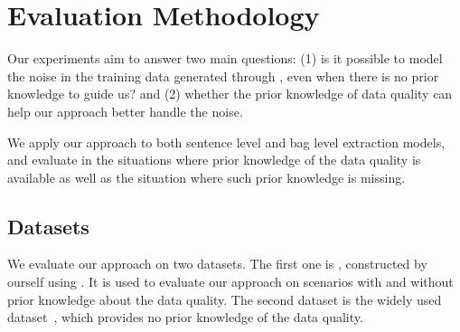 \section{Evaluation Methodology}

Our experiments aim to answer two main questions:
(1) is it possible to model the noise in the training data generated through  \DS, even when there is no prior knowledge to guide us?
%
and (2) whether the prior knowledge of data quality can help our approach better handle the noise.

We apply our approach to both sentence level and bag level
extraction models, and evaluate in the situations where prior knowledge of
the data quality is available as well as the situation where such prior
knowledge is missing.


\subsection{Datasets}
We evaluate our approach on two datasets. The first one is  \TimeRE, constructed by ourself using \DS.
 It is used to evaluate our approach on scenarios with and without prior knowledge about the
data quality. The second dataset is the widely used \EntityRE dataset~\cite{riedel2010modeling},
which provides no prior knowledge of the data quality.


